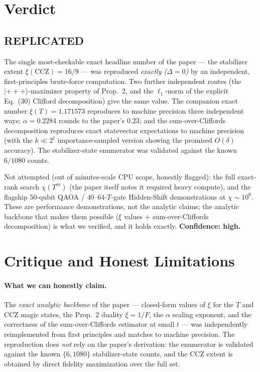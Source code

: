 \documentclass[11pt]{article}
\begin{document}
\section{Verdict}

\subsection*{REPLICATED}

The single most-checkable exact headline number of the paper --- the stabilizer extent
$\xi(\mathrm{CCZ}) = 16/9$ --- was reproduced \emph{exactly ($\Delta = 0$)} by an
independent, first-principles brute-force computation. Two further independent routes
(the $|{+}{+}{+}\rangle$-maximizer property of Prop.~2, and the $\ell_1$-norm of the
explicit Eq.~(30) Clifford decomposition) give the same value. The companion exact
number $\xi(T) = 1.171573$ reproduces to machine precision three independent ways;
$\alpha = 0.2284$ rounds to the paper's $0.23$; and the sum-over-Cliffords decomposition
reproduces exact statevector expectations to machine precision (with the $k \ll 2^t$
importance-sampled version showing the promised $O(\delta)$ accuracy). The stabilizer-state
enumerator was validated against the known $6/1080$ counts.

Not attempted (out of minutes-scale CPU scope, honestly flagged): the full exact-rank
search $\chi(T^m)$ (the paper itself notes it required heavy compute), and the flagship
$50$-qubit QAOA / $40$--$64$-$T$-gate Hidden-Shift demonstrations at $\chi \sim 10^6$.
These are performance demonstrations, not the analytic claims; the analytic backbone
that makes them possible ($\xi$ values + sum-over-Cliffords decomposition) is what we
verified, and it holds exactly. \textbf{Confidence: high.}

\section{Critique and Honest Limitations}

\paragraph{What we can honestly claim.}
The \emph{exact analytic backbone} of the paper --- closed-form values of $\xi$ for the
$T$ and CCZ magic states, the Prop.~2 duality $\xi = 1/F$, the $\alpha$ scaling exponent,
and the correctness of the sum-over-Cliffords estimator at small $t$ --- was independently
reimplemented from first principles and matches to machine precision. The reproduction
does \emph{not} rely on the paper's derivation: the enumerator is validated against the
known $\{6, 1080\}$ stabilizer-state counts, and the CCZ extent is obtained by direct
fidelity maximization over the full set.
\end{document}
